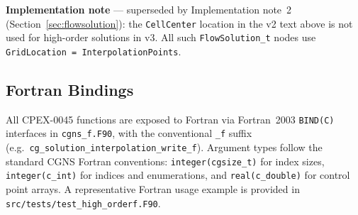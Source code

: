 \documentclass[11pt,letterpaper]{article}
\begin{document}
\noindent\textbf{Implementation note} --- superseded by Implementation note~2
(Section~\ref{sec:flowsolution}): the \texttt{CellCenter} location in the v2 text above is
not used for high-order solutions in v3.  All such \texttt{FlowSolution\_t} nodes use
\texttt{GridLocation = InterpolationPoints}.

\subsection{Fortran Bindings}
\label{sec:fortran}

All CPEX-0045 functions are exposed to Fortran via Fortran~2003 \texttt{BIND(C)} interfaces in
\texttt{cgns\_f.F90}, with the conventional \texttt{\_f} suffix
(e.g.\ \texttt{cg\_solution\_interpolation\_write\_f}).  Argument types follow the standard CGNS
Fortran conventions: \texttt{integer(cgsize\_t)} for index sizes, \texttt{integer(c\_int)} for
indices and enumerations, and \texttt{real(c\_double)} for control point arrays.
A representative Fortran usage example is provided in \texttt{src/tests/test\_high\_orderf.F90}.
\end{document}
